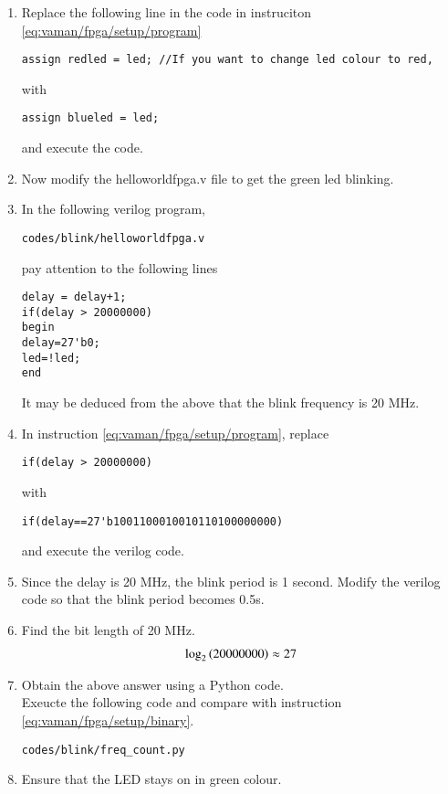 \begin{enumerate}[label=\arabic*.,ref=\theenumi]
\item Replace  the following line in the code in instruciton  \ref{eq:vaman/fpga/setup/program} 
\begin{lstlisting}
assign redled = led; //If you want to change led colour to red,
\end{lstlisting}
with
\begin{lstlisting}
assign blueled = led; 
\end{lstlisting}
and execute the code.
\item Now modify the helloworldfpga.v  file to get the green led blinking.
\item In the following verilog program, 
\label{eq:vaman/fpga/setup/program}
\begin{lstlisting}
codes/blink/helloworldfpga.v
\end{lstlisting}
pay attention to the following lines
\begin{lstlisting}
delay = delay+1;                                                                                                   
if(delay > 20000000)
begin
delay=27'b0;
led=!led;
end
\end{lstlisting}
It may be deduced from the above that the blink frequency is 20 MHz.
\item In instruction  \ref{eq:vaman/fpga/setup/program}, replace
\label{eq:vaman/fpga/setup/binary}
\begin{lstlisting}
if(delay > 20000000)
\end{lstlisting}
%
with
\begin{lstlisting}
if(delay==27'b1001100010010110100000000)
\end{lstlisting}
and execute the verilog code.
\item Since the delay is 20 MHz, the blink period is 1 second.  Modify the verilog code
so that the blink period becomes 0.5s.
\item Find the bit length of 20 MHz.
\\
\solution 
\begin{align}
\log_2\left(20000000\right) \approx 27
\end{align}
\item Obtain the above answer using a Python code.
\\
\solution Exeucte the following code and compare with instruction  \ref{eq:vaman/fpga/setup/binary}.
\begin{lstlisting}
codes/blink/freq_count.py
\end{lstlisting}
\item Ensure that the LED stays on in green colour.

\end{enumerate}
